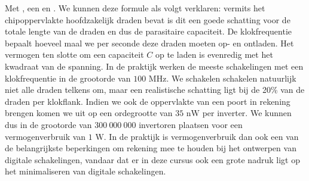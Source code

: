 \begin{itemize}
Met , een  en . We kunnen deze formule als volgt verklaren: vermits het chipoppervlakte hoofdzakelijk draden bevat is dit een goede schatting voor de totale lengte van de draden en dus de parasitaire capaciteit. De klokfrequentie bepaalt hoeveel maal we per seconde deze draden moeten op- en ontladen. Het vermogen ten slotte om een capaciteit $C$ op te laden is evenredig met het kwadraat van de spanning. In de praktijk werken de meeste schakelingen met een klokfrequentie in de grootorde van $100\mbox{ MHz}$. We schakelen schakelen natuurlijk niet alle draden telkens om, maar een realistische schatting ligt bij de 20\% van de draden per klokflank. Indien we ook de oppervlakte van een poort in rekening brengen komen we uit op een ordegrootte van $35\mbox{ nW}$ per inverter. We kunnen dus in de grootorde van $300\ 000\ 000$ invertoren plaatsen voor een vermogenverbruik van $1\mbox{ W}$. In de praktijk is vermogenverbruik dan ook een van de belangrijkste beperkingen om rekening mee te houden bij het ontwerpen van digitale schakelingen, vandaar dat er in deze cursus ook een grote nadruk ligt op het minimaliseren van digitale schakelingen.
\end{itemize}

